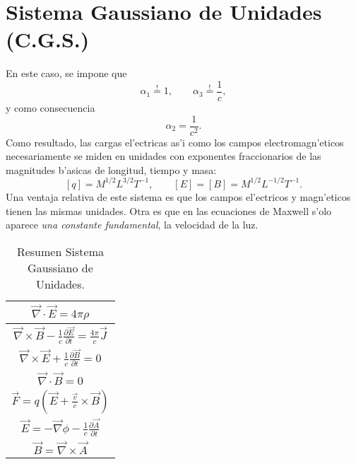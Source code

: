 \section{Sistema Gaussiano de Unidades (C.G.S.)}\label{appunid}
En este caso, se impone que
\begin{equation}
 \alpha_1\stackrel{!}{=} 1, \qquad \alpha_3\stackrel{!}{=} \frac{1}{c},
\end{equation}
y como consecuencia
\begin{equation}
\alpha_2=\frac{1}{c^2}.
\end{equation} 
Como resultado, las cargas el'ectricas as'i como los campos electromagn'eticos necesariamente se miden en unidades con exponentes fraccionarios de las magnitudes b'asicas de longitud, tiempo y masa:
\begin{equation}
 \left[q\right]=M^{1/2}L^{3/2}T^{-1}, \qquad
\left[E\right]=\left[B\right]=M^{1/2}L^{-1/2}T^{-1}.
\end{equation} 
Una ventaja relativa de este sistema es que los campos el'ectricos y magn'eticos tienen las mismas unidades. Otra es que en las ecuaciones de Maxwell s'olo aparece \textit{una constante fundamental}, la velocidad de la luz.
\begin{table}
\begin{center}
\begin{tabular}{|c|}\hline
$\vec{\nabla}\cdot\vec{E}=4\pi\rho$ \\\hline
$\vec{\nabla}\times \vec{B}-\frac{1}{c}\frac{\partial\vec{E}}{\partial t}=
\frac{4\pi}{c}\vec{J}$ \\\hline
$\vec{\nabla}\times \vec{E}+\frac{1}{c}\frac{\partial\vec{B}}{\partial t}=0$
\\\hline
$\vec{\nabla}\cdot\vec{B}=0$\\\hline
$\vec{F}=q\left(\vec{E}+\frac{\vec{v}}{c}\times \vec{B}\right)$\\\hline
$\vec{E}=-\vec{\nabla}\phi-\frac{1}{c}\frac{\partial \vec{A}}{\partial
t}$\\\hline
$\vec{B}=\vec{\nabla}\times \vec{A}$\\\hline
\end{tabular}
\label{TUSG}
\caption{Resumen Sistema Gaussiano de Unidades.}
\end{center}
\end{table}

